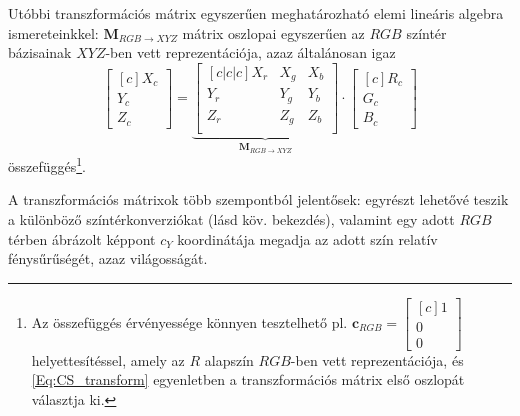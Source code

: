 Utóbbi transzformációs mátrix egyszerűen meghatározható elemi lineáris algebra ismereteinkkel:
$\mathbf{M}_{R\!G\!B \rightarrow X\!Y\!Z}$  mátrix oszlopai egyszerűen az $RGB$ színtér bázisainak $XYZ$-ben vett reprezentációja, azaz általánosan igaz
\begin{equation}
\begin{bmatrix}[c]
       X_c \\[0.3em]
       Y_c \\[0.3em]
       Z_c \end{bmatrix}
       = 
       \underbrace{
  \begin{bmatrix}[c|c|c]
   X_r & X_g & X_b  \\
   Y_r & Y_g & Y_b \\
   Z_r & Z_g & Z_b  \\
\end{bmatrix}}_{\mathbf{M}_{R\!G\!B \rightarrow X\!Y\!Z}}
\cdot
\begin{bmatrix}[c]
       R_c \\[0.3em]
       G_c \\[0.3em]
       B_c \end{bmatrix}
\label{Eq:CS_transform}
\end{equation}
összefüggés\footnote{Az összefüggés érvényessége könnyen tesztelhető pl. $\mathbf{c}_{RGB} = \begin{bmatrix}[c]
       1 \\[0.3em]
       0 \\[0.3em]
       0 \end{bmatrix}$ helyettesítéssel, amely az $R$ alapszín $RGB$-ben vett reprezentációja, és \eqref{Eq:CS_transform} egyenletben a transzformációs mátrix első oszlopát választja ki.}.

A transzformációs mátrixok több szempontból jelentősek: 
egyrészt lehetővé teszik a különböző színtérkonverziókat (lásd köv. bekezdés), valamint egy adott $RGB$ térben ábrázolt képpont $c_Y$ koordinátája megadja az adott szín relatív fénysűrűségét, azaz világosságát.

